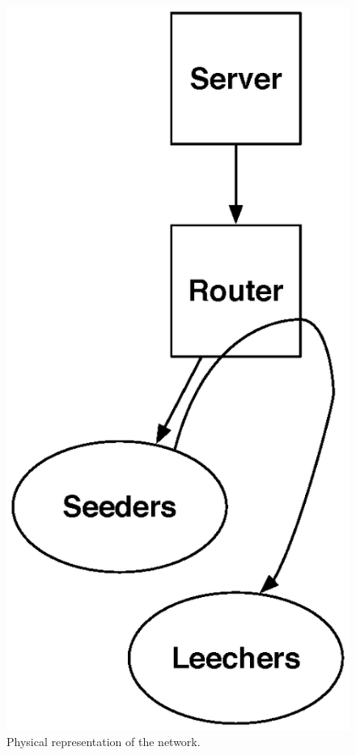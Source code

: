 \documentclass[conference]{IEEEtran}
\begin{document}
\begin{figure}[ht!]
\begin{center}
\includegraphics[scale=0.35]{graphs/topology.eps}
\end{center}
\caption{Physical representation of the network.}
\label{fig:dummy}
\vspace{-2mm}
\end{figure} 
\end{document}
